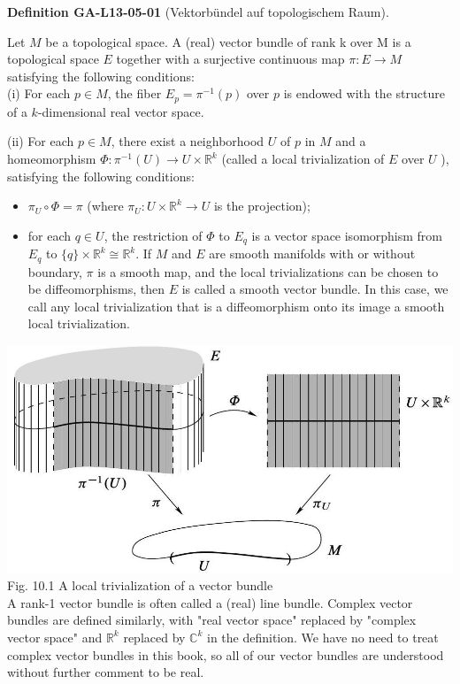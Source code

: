 \documentclass[10pt, letterpaper]{article}
\newcommand{\CustomHeading}[3]{%
  \par\medskip\noindent%
  \textbf{#1 #2} \textnormal{(#3)}.\enskip%
}
\newenvironment{DEF}[2]{\begin{unitbox}\CustomHeading{Definition}{#1}{#2}}{\end{unitbox}}
\begin{document}
\begin{DEF}{GA-L13-05-01}{Vektorbündel auf topologischem Raum}
Let $M$ be a topological space. A (real) vector bundle of rank k over M is a topological space $E$ together with a surjective continuous map $\pi: E \rightarrow M$ satisfying the following conditions:\\
(i) For each $p \in M$, the fiber $E_{p}=\pi^{-1}(p)$ over $p$ is endowed with the structure of a $k$-dimensional real vector space.

(ii) For each $p \in M$, there exist a neighborhood $U$ of $p$ in $M$ and a homeomorphism $\Phi: \pi^{-1}(U) \rightarrow U \times \mathbb{R}^{k}$ (called a local trivialization of $E$ over $U$ ), satisfying the following conditions:
\begin{itemize}
  \item $\pi_{U} \circ \Phi=\pi$ (where $\pi_{U}: U \times \mathbb{R}^{k} \rightarrow U$ is the projection);
  \item for each $q \in U$, the restriction of $\Phi$ to $E_{q}$ is a vector space isomorphism from $E_{q}$ to $\{q\} \times \mathbb{R}^{k} \cong \mathbb{R}^{k}$.
  If $M$ and $E$ are smooth manifolds with or without boundary, $\pi$ is a smooth map, and the local trivializations can be chosen to be diffeomorphisms, then $E$ is called a smooth vector bundle. In this case, we call any local trivialization that is a diffeomorphism onto its image a smooth local trivialization.
\end{itemize}
\end{DEF}


\includegraphics[scale=0.2, center]{2025_06_03_90f64b1a1e243cccc2e0g-268}
Fig. 10.1 A local trivialization of a vector bundle\\



A rank-1 vector bundle is often called a (real) line bundle. Complex vector bundles are defined similarly, with "real vector space" replaced by "complex vector space" and $\mathbb{R}^{k}$ replaced by $\mathbb{C}^{k}$ in the definition. We have no need to treat complex vector bundles in this book, so all of our vector bundles are understood without further comment to be real.
\end{document}
